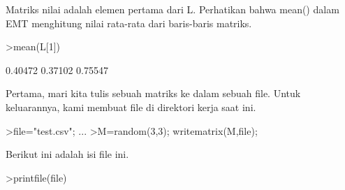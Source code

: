 \documentclass[a4paper,10pt]{article}
\begin{document}
\begin{eulernotebook}
\begin{eulercomment}
\begin{eulercomment}
\begin{eulercomment}
\begin{eulercomment}
\begin{eulercomment}
\begin{eulercomment}
\begin{eulercomment}
\begin{eulercomment}
\begin{eulercomment}
\begin{eulercomment}
\begin{eulercomment}
\begin{eulercomment}
\begin{eulercomment}
\begin{eulercomment}
\begin{eulercomment}
\begin{eulercomment}
\begin{eulercomment}
\begin{eulercomment}
\begin{eulercomment}
\begin{eulercomment}
\begin{eulercomment}
\begin{eulercomment}
\begin{eulercomment}
\begin{eulercomment}
\begin{eulercomment}
\begin{eulercomment}
\begin{eulercomment}
\begin{eulercomment}
\begin{eulercomment}
\begin{eulercomment}
\begin{eulercomment}
\begin{eulercomment}
\begin{eulercomment}
\begin{eulercomment}
\begin{eulercomment}
\begin{eulercomment}
\begin{eulercomment}
\begin{eulercomment}
\begin{eulercomment}
\begin{eulercomment}
\begin{eulercomment}
\begin{eulercomment}
\begin{eulercomment}
\begin{eulercomment}
\begin{eulercomment}
\begin{eulercomment}
\begin{eulercomment}
\begin{eulercomment}
\begin{eulercomment}
\begin{eulercomment}
\begin{eulercomment}
Matriks nilai adalah elemen pertama dari L. Perhatikan bahwa mean()
dalam EMT menghitung nilai rata-rata dari baris-baris matriks.
\end{eulercomment}
\begin{eulerprompt}
>mean(L[1])
\end{eulerprompt}
\begin{euleroutput}
    0.40472 
    0.37102 
    0.75547 
\end{euleroutput}
\begin{eulercomment}
Pertama, mari kita tulis sebuah matriks ke dalam sebuah file. Untuk
keluarannya, kami membuat file di direktori kerja saat ini.
\end{eulercomment}
\begin{eulerprompt}
>file="test.csv";  ...
>M=random(3,3); writematrix(M,file);
\end{eulerprompt}
\begin{eulercomment}
Berikut ini adalah isi file ini.
\end{eulercomment}
\begin{eulerprompt}
>printfile(file)
\end{eulerprompt}
\begin{euleroutput}

\end{euleroutput}
\end{eulercomment}
\end{eulercomment}
\end{eulercomment}
\end{eulercomment}
\end{eulercomment}
\end{eulercomment}
\end{eulercomment}
\end{eulercomment}
\end{eulercomment}
\end{eulercomment}
\end{eulercomment}
\end{eulercomment}
\end{eulercomment}
\end{eulercomment}
\end{eulercomment}
\end{eulercomment}
\end{eulercomment}
\end{eulercomment}
\end{eulercomment}
\end{eulercomment}
\end{eulercomment}
\end{eulercomment}
\end{eulercomment}
\end{eulercomment}
\end{eulercomment}
\end{eulercomment}
\end{eulercomment}
\end{eulercomment}
\end{eulercomment}
\end{eulercomment}
\end{eulercomment}
\end{eulercomment}
\end{eulercomment}
\end{eulercomment}
\end{eulercomment}
\end{eulercomment}
\end{eulercomment}
\end{eulercomment}
\end{eulercomment}
\end{eulercomment}
\end{eulercomment}
\end{eulercomment}
\end{eulercomment}
\end{eulercomment}
\end{eulercomment}
\end{eulercomment}
\end{eulercomment}
\end{eulercomment}
\end{eulercomment}
\end{eulercomment}
\end{eulernotebook}
\end{document}
